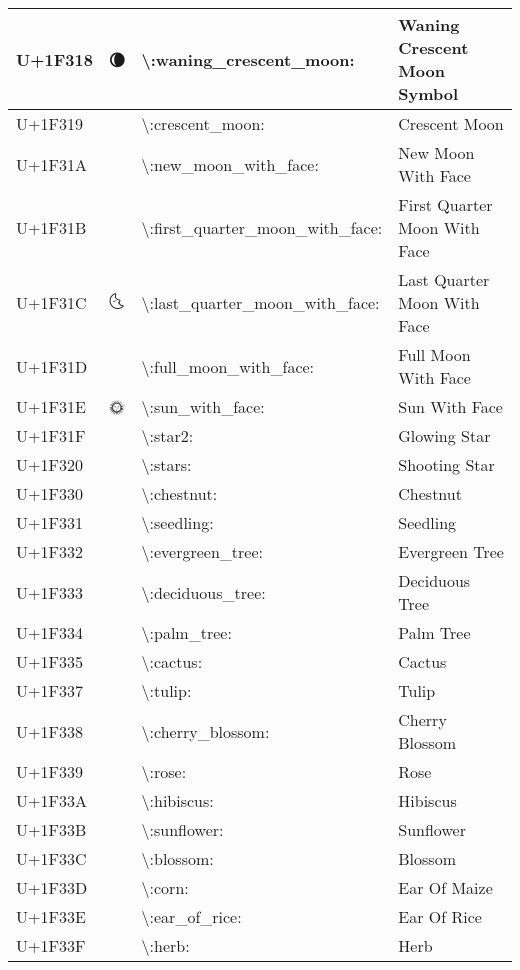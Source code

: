 \begin{table}[h]
\begin{tabulary}{\linewidth}{|L|L|L|L|}
\hline
U+1F318 & 🌘 & {\textbackslash}:waning\_crescent\_moon: & Waning Crescent Moon Symbol \\
\hline
U+1F319 & 🌙 & {\textbackslash}:crescent\_moon: & Crescent Moon \\
\hline
U+1F31A & 🌚 & {\textbackslash}:new\_moon\_with\_face: & New Moon With Face \\
\hline
U+1F31B & 🌛 & {\textbackslash}:first\_quarter\_moon\_with\_face: & First Quarter Moon With Face \\
\hline
U+1F31C & 🌜 & {\textbackslash}:last\_quarter\_moon\_with\_face: & Last Quarter Moon With Face \\
\hline
U+1F31D & 🌝 & {\textbackslash}:full\_moon\_with\_face: & Full Moon With Face \\
\hline
U+1F31E & 🌞 & {\textbackslash}:sun\_with\_face: & Sun With Face \\
\hline
U+1F31F & 🌟 & {\textbackslash}:star2: & Glowing Star \\
\hline
U+1F320 & 🌠 & {\textbackslash}:stars: & Shooting Star \\
\hline
U+1F330 & 🌰 & {\textbackslash}:chestnut: & Chestnut \\
\hline
U+1F331 & 🌱 & {\textbackslash}:seedling: & Seedling \\
\hline
U+1F332 & 🌲 & {\textbackslash}:evergreen\_tree: & Evergreen Tree \\
\hline
U+1F333 & 🌳 & {\textbackslash}:deciduous\_tree: & Deciduous Tree \\
\hline
U+1F334 & 🌴 & {\textbackslash}:palm\_tree: & Palm Tree \\
\hline
U+1F335 & 🌵 & {\textbackslash}:cactus: & Cactus \\
\hline
U+1F337 & 🌷 & {\textbackslash}:tulip: & Tulip \\
\hline
U+1F338 & 🌸 & {\textbackslash}:cherry\_blossom: & Cherry Blossom \\
\hline
U+1F339 & 🌹 & {\textbackslash}:rose: & Rose \\
\hline
U+1F33A & 🌺 & {\textbackslash}:hibiscus: & Hibiscus \\
\hline
U+1F33B & 🌻 & {\textbackslash}:sunflower: & Sunflower \\
\hline
U+1F33C & 🌼 & {\textbackslash}:blossom: & Blossom \\
\hline
U+1F33D & 🌽 & {\textbackslash}:corn: & Ear Of Maize \\
\hline
U+1F33E & 🌾 & {\textbackslash}:ear\_of\_rice: & Ear Of Rice \\
\hline
U+1F33F & 🌿 & {\textbackslash}:herb: & Herb \\

\end{tabulary}
\end{table}
